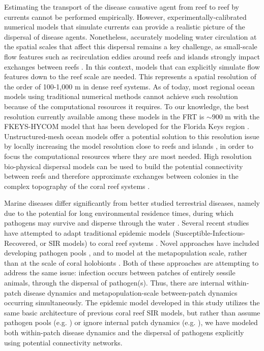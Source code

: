 \documentclass[utf8]{frontiersSCNS}
\begin{document}
Estimating the transport of the disease causative agent from reef to reef by currents cannot be performed empirically. However, experimentally-calibrated numerical models that simulate currents can provide a realistic picture of the dispersal of disease agents. Nonetheless, accurately modeling water circulation at the spatial scales that affect this dispersal remains a key challenge, as small-scale flow features such as recirculation eddies around reefs and islands strongly impact exchanges between reefs \citep{wolanski1994physical, burgess2007influence, figueiredo2013synthesizing}. In this context, models that can explicitly simulate flow features down to the reef scale are needed. This represents a spatial resolution of the order of 100-1,000 m in dense reef systems. As of today, most regional ocean models using traditional numerical methods cannot achieve such resolution because of the computational resources it requires. To our knowledge, the best resolution currently available among these models in the FRT is $\sim900$ m with the FKEYS-HYCOM model that has been developed for the Florida Keys region \citep{kourafalou2012florida, sponaugle2012observed, vaz2016perfect}. Unstructured-mesh ocean models offer a potential solution to this resolution issue by locally increasing the model resolution close to reefs and islands \citep{lambrechts2008multi, thomas2014numerical, thomas2015connectivity}, in order to focus the computational resources where they are most needed. High resolution bio-physical dispersal models can be used to build the potential connectivity between reefs and therefore approximate exchanges between colonies in the complex topography of the coral reef systems \citep{frys20}.

Marine diseases differ significantly from better studied terrestrial diseases, namely due to the potential for long environmental residence times, during which pathogens may survive and disperse through the water \citep{harvell2007coral, sokolow2009editor}. Several recent studies have attempted to adapt traditional epidemic models (Susceptible-Infectious-Recovered, or SIR models) to coral reef systems \citep{sokolow2009editor, bidegain2016microparasitic, bidegain2016marine}. Novel approaches have included developing pathogen pools \citep{bidegain2016microparasitic, bidegain2016marine}, and to model at the metapopulation scale, rather than at the scale of coral holobionts \citep{sokolow2009editor}. Both of these approaches are attempting to address the same issue: infection occurs between patches of entirely sessile animals, through the dispersal of pathogen(s). Thus, there are internal within-patch disease dynamics and metapopulation-scale between-patch dynamics occurring simultaneously. The epidemic model developed in this study utilizes the same basic architecture of previous coral reef SIR models, but rather than assume pathogen pools (e.g. \cite{bidegain2016microparasitic, bidegain2016marine}) or ignore internal patch dynamics (e.g. \cite{sokolow2009editor}), we have modeled both within-patch disease dynamics and the dispersal of pathogens explicitly using potential connectivity networks.
\end{document}
